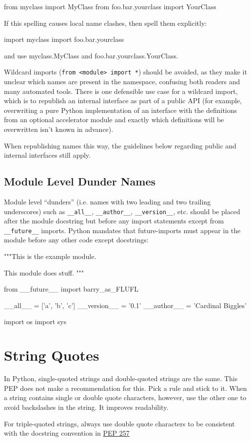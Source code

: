\documentclass[a4paper,11pt]{article}
\begin{document}
\begin{python}
from myclass import MyClass
from foo.bar.yourclass import YourClass
\end{python}
If this spelling causes local name clashes, then spell them explicitly:
\par
\begin{python}
import myclass
import foo.bar.yourclass
\end{python}
and use myclass.MyClass and foo.bar.yourclass.YourClass.
\par
Wildcard imports (\verb"from <module> import *") should be avoided, as they 
make it unclear which names are present in the namespace, confusing both 
readers and many automated tools. There is one defensible use case for a 
wildcard import, which is to republish an internal interface as part of a 
public API (for example, overwriting a pure Python implementation of an 
interface with the definitions from an optional accelerator module and 
exactly which definitions will be overwritten isn’t known in advance).
\par
When republishing names this way, the guidelines below regarding public and
internal interfaces still apply.
\par
\subsection{Module Level Dunder Names}
Module level “dunders” (i.e. names with two leading and two trailing 
underscores) such as \verb"__all__", \verb"__author__", \verb"__version__", 
etc. should be placed after the module docstring but before any import 
statements except from \verb"__future__" imports. Python mandates that 
future-imports must appear in the module before any other code except 
docstrings:
\par
\begin{python}
"""This is the example module.

This module does stuff.
"""

from __future__ import barry_as_FLUFL

__all__ = ['a', 'b', 'c']
__version__ = '0.1'
__author__ = 'Cardinal Biggles'

import os
import sys
\end{python}
\section{String Quotes}
In Python, single-quoted strings and double-quoted strings are the same. This 
PEP does not make a recommendation for this. Pick a rule and stick to it. 
When a string contains single or double quote characters, however, use the 
other one to avoid backslashes in the string. It improves readability.
\par
For triple-quoted strings, always use double quote characters to be 
consistent with the docstring convention in
\href{https://peps.python.org/pep-0257/}{PEP 257}
\end{document}
